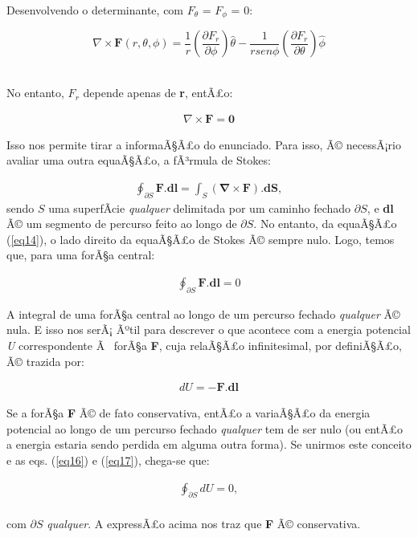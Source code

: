 Desenvolvendo o determinante, com $F_{\theta}$ = $F_{\phi}$ = 0:

\[
	\nabla \times \textbf{F} (r,\theta,\phi) = \frac{1}{r}\left(\frac{\partial F_r}{\partial \phi}\right)\hat{\theta} - \frac{1}{rsen\phi}\left(\frac{\partial F_r}{\partial \theta}\right)\hat{\phi}
\]
{\\}

No entanto, $F_r$ depende apenas de \textbf{r}, entÃ£o:

\begin{eqnarray}
	\nabla \times \mathbf{F} = \mathbf{0} \label{eq14}
\end{eqnarray}

Isso nos permite tirar a informaÃ§Ã£o do enunciado. Para isso, Ã© necessÃ¡rio avaliar uma outra equaÃ§Ã£o, a fÃ³rmula de Stokes:

\begin{eqnarray}
	\oint_{\partial S} \mathbf{F}.\mathbf{dl} = \int_S (\mathbf{\nabla \times F}).\mathbf{dS}, \label{eq15}
\end{eqnarray}
sendo $S$ uma superfÃ­cie \textit{qualquer} delimitada por um caminho fechado $\partial S$, e \textbf{dl} Ã© um segmento de percurso feito ao longo de $\partial S$. No entanto, da equaÃ§Ã£o (\ref{eq14}), o lado direito da equaÃ§Ã£o de Stokes Ã© sempre nulo. Logo, temos que, para uma forÃ§a central:

\begin{eqnarray}
	\oint_{\partial S} \mathbf{F}.\mathbf{dl} = 0 \label{eq16}
\end{eqnarray}

A integral de uma forÃ§a central ao longo de um percurso fechado \textit{qualquer} Ã© nula. E isso nos serÃ¡ Ãºtil para descrever o que acontece com a energia potencial \textit{U} correspondente Ã  forÃ§a \textbf{F}, cuja relaÃ§Ã£o infinitesimal, por definiÃ§Ã£o, Ã© trazida por:

\begin{eqnarray}
	dU= - \mathbf{F}.\mathbf{dl}  \label{eq17}
\end{eqnarray}

Se a forÃ§a \textbf{F} Ã© de fato conservativa, entÃ£o a variaÃ§Ã£o da energia potencial ao longo de um percurso fechado \textit{qualquer} tem de ser nulo (ou entÃ£o a energia estaria sendo perdida em alguma outra forma). Se unirmos este conceito e as eqs. (\ref{eq16}) e (\ref{eq17}), chega-se que:

\begin{eqnarray}
	\oint_{\partial S} dU = 0, \label{eq18}
\end{eqnarray}
{\\}com $\partial S$ \textit{qualquer}. A expressÃ£o acima nos traz que \textbf{F} Ã© conservativa.

